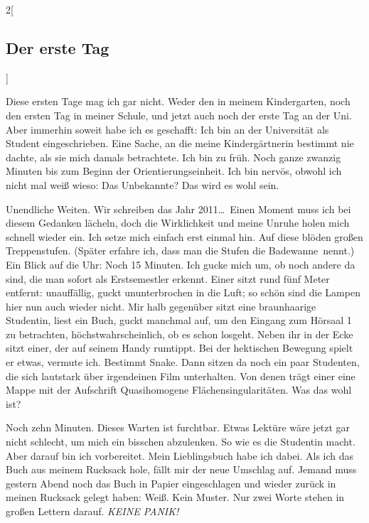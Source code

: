 \begin{multicols}{2}[\subsection{Der erste Tag}]

Diese ersten Tage mag ich gar nicht. Weder den in meinem Kindergarten, noch den
ersten Tag in meiner Schule, und jetzt auch noch der erste Tag an der Uni. Aber
immerhin soweit habe ich es geschafft: Ich bin an der Universität als Student
eingeschrieben. Eine Sache, an die meine Kindergärtnerin bestimmt nie dachte,
als sie mich damals betrachtete. Ich bin zu früh. Noch ganze zwanzig Minuten
bis zum Beginn der Orientierungseinheit.  Ich bin nervös, obwohl ich nicht mal
weiß wieso: Das Unbekannte? Das wird es wohl sein.

Unendliche Weiten. Wir schreiben das Jahr 2011\dots\ Einen Moment muss ich bei
diesem Gedanken lächeln, doch die Wirklichkeit und meine Unruhe holen mich
schnell wieder ein.  Ich setze mich einfach erst einmal hin.  Auf diese blöden
großen Treppenstufen. (Später erfahre ich, dass man die Stufen \glqq die
Badewanne\grqq\ nennt.) Ein Blick auf die Uhr: Noch 15 Minuten. Ich gucke mich
um, ob noch andere da sind, die man sofort als Erstsemestler erkennt. Einer
sitzt rund fünf Meter entfernt: unauffällig, guckt ununterbrochen in die Luft;
so schön sind die Lampen hier nun auch wieder nicht. Mir halb gegenüber sitzt
eine braunhaarige Studentin, liest ein Buch, guckt manchmal auf, um den Eingang
zum Hörsaal 1 zu betrachten, höchstwahrscheinlich, ob es schon losgeht. Neben
ihr in der Ecke sitzt einer, der auf seinem Handy rumtippt. Bei der hektischen
Bewegung spielt er etwas, vermute ich.  Bestimmt Snake. Dann sitzen da noch ein
paar Studenten, die sich lautstark über irgendeinen Film unterhalten. Von denen
trägt einer eine Mappe mit der Aufschrift \glqq Quasihomogene
Flächensingularitäten\grqq. Was das wohl ist?

Noch zehn Minuten. Dieses Warten ist furchtbar. Etwas Lektüre wäre jetzt gar
nicht schlecht, um mich ein bisschen abzulenken. So wie es die Studentin macht.
Aber darauf bin ich vorbereitet. Mein Lieblingsbuch habe ich dabei. Als ich das
Buch aus meinem Rucksack hole, fällt mir der neue Umschlag auf. Jemand muss
gestern Abend noch das Buch in Papier eingeschlagen und wieder zurück in meinen
Rucksack gelegt haben: Weiß. Kein Muster. Nur zwei Worte stehen in großen
Lettern darauf. \emph{KEINE PANIK!}


\end{multicols}
